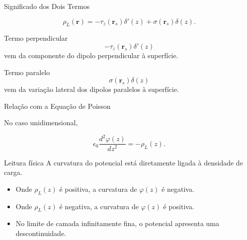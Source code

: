 \documentclass[aspectratio=169]{beamer}
\begin{document}
\begin{frame}{Significado dos Dois Termos}

\begin{eqbox}
\begin{equation}
\rho_L(\mathbf r)
=
-\tau_z(\mathbf r_s)\delta'(z)
+
\sigma(\mathbf r_s)\delta(z).
\tag{4.41}
\end{equation}
\end{eqbox}

\begin{mybox}{Termo perpendicular}
\[
-\tau_z(\mathbf r_s)\delta'(z)
\]
vem da componente do dipolo perpendicular à superfície.
\end{mybox}

\begin{mybox}{Termo paralelo}
\[
\sigma(\mathbf r_s)\delta(z)
\]
vem da variação lateral dos dipolos paralelos à superfície.
\end{mybox}

\end{frame}

\begin{frame}{Relação com a Equação de Poisson}

No caso unidimensional,

\begin{eqbox}
\begin{equation}
\epsilon_0
\frac{d^2\varphi(z)}{dz^2}
=
-\rho_L(z).
\tag{4.42}
\label{eq:4.42}
\end{equation}
\end{eqbox}

\begin{mybox}{Leitura física}
A curvatura do potencial está diretamente ligada à densidade de carga.
\end{mybox}

\begin{itemize}
\item Onde \(\rho_L(z)\) é positiva, a curvatura de \(\varphi(z)\) é negativa.
\item Onde \(\rho_L(z)\) é negativa, a curvatura de \(\varphi(z)\) é positiva.
\item No limite de camada infinitamente fina, o potencial apresenta uma descontinuidade.
\end{itemize}

\end{frame}
\end{document}
